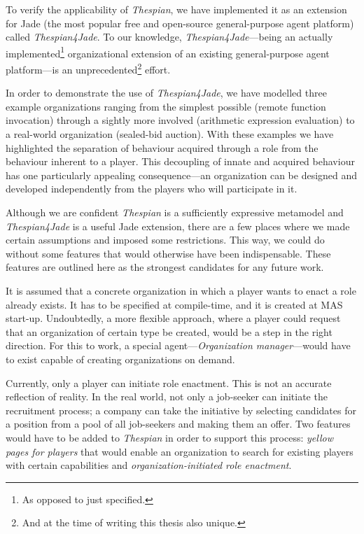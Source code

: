 To verify the applicability of \textit{Thespian}, we have implemented it as an extension for Jade (the most popular free and open-source general-purpose agent platform) called \textit{Thespian4Jade}.
To our knowledge, \textit{Thespian4Jade}---being an actually implemented\footnote{As opposed to just specified.} organizational extension of an existing general-purpose agent platform---is an unprecedented\footnote{And at the time of writing this thesis also unique.} effort.

In order to demonstrate the use of \textit{Thespian4Jade}, we have modelled three example organizations ranging from the simplest possible (remote function invocation) through a sightly more involved (arithmetic expression evaluation) to a real-world organization (sealed-bid auction).
With these examples we have highlighted the separation of behaviour acquired through a role from the behaviour inherent to a player.
This decoupling of innate and acquired behaviour has one particularly appealing consequence---an organization can be designed and developed independently from the players who will participate in it. 


Although we are confident \textit{Thespian} is a sufficiently expressive metamodel and \textit{Thespian4Jade} is a useful Jade extension, there are a few places where we made certain assumptions and imposed some restrictions.
This way, we could do without some features that would otherwise have been indispensable.
These features are outlined here as the strongest candidates for any future work.

It is assumed that a concrete organization in which a player wants to enact a role already exists.
It has to be specified at compile-time, and it is created at MAS start-up.
Undoubtedly, a more flexible approach, where a player could request that an organization of certain type be created, would be a step in the right direction.
For this to work, a special agent---\textit{Organization manager}---would have to exist capable of creating organizations on demand.

Currently, only a player can initiate role enactment.
This is not an accurate reflection of reality.
In the real world, not only a job-seeker can initiate the recruitment process; a company can take the initiative by selecting candidates for a position from a pool of all job-seekers and making them an offer.
Two features would have to be added to \textit{Thespian} in order to support this process: \textit{yellow pages for players} that would enable an organization to search for existing players with certain capabilities and \textit{organization-initiated role enactment}.

